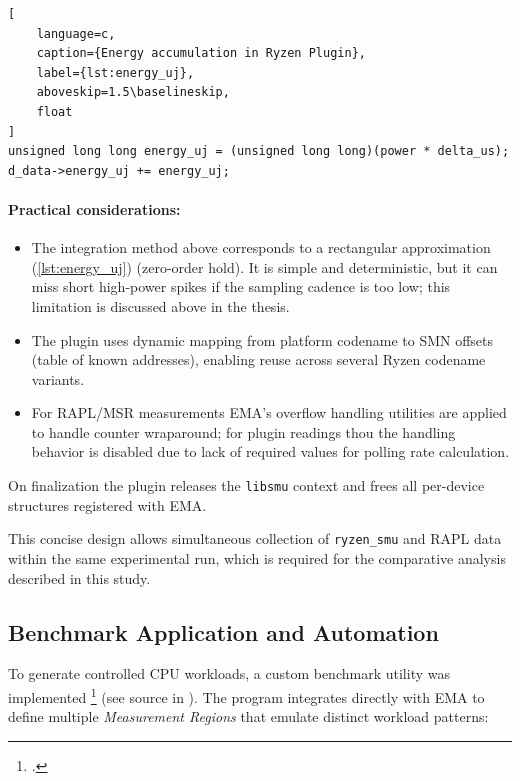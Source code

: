 \begin{samepage}
\begin{lstlisting}[
    language=c,
    caption={Energy accumulation in Ryzen Plugin},
    label={lst:energy_uj},
    aboveskip=1.5\baselineskip,
    float
]
unsigned long long energy_uj = (unsigned long long)(power * delta_us);
d_data->energy_uj += energy_uj;
\end{lstlisting}
\end{samepage}

\paragraph{Practical considerations:}
\begin{itemize}
  \item The integration method above corresponds to a rectangular
    approximation (\cref{lst:energy_uj}) (zero-order hold). It is simple and
    deterministic, but it can miss short high-power spikes if the sampling
    cadence is too low; this limitation is discussed above in the thesis.
  \item The plugin uses dynamic mapping from platform codename to \gls{SMN}
    offsets (table of known addresses), enabling reuse across several
    Ryzen codename variants.
  \item For \gls{RAPL}/\gls{MSR} measurements \gls{EMA}'s overflow handling
    utilities are applied to handle counter wraparound; for plugin readings 
    thou the handling behavior is disabled due to lack of required values
    for polling rate calculation.
\end{itemize}

On finalization the plugin releases the \texttt{libsmu} context and
frees all per-device structures registered with \gls{EMA}.

This concise design allows simultaneous collection of \texttt{ryzen\_smu} and
\gls{RAPL} data within the same experimental run, which is required for the
comparative analysis described in this study.

\subsection{Benchmark Application and Automation}

To generate controlled \gls{CPU} workloads, a custom benchmark utility was
implemented \footcite{yahdzhyiev2025repo} (see source in
). The program integrates directly with \gls{EMA}
to define multiple \emph{Measurement Regions} that emulate distinct workload
patterns:

